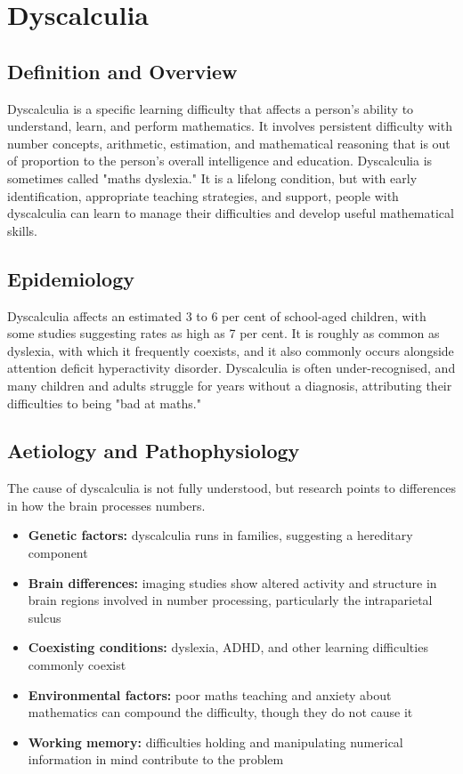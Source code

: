 \chapter{Dyscalculia}

\section*{Definition and Overview}
Dyscalculia is a specific learning difficulty that affects a person's ability to understand, learn, and perform mathematics. It involves persistent difficulty with number concepts, arithmetic, estimation, and mathematical reasoning that is out of proportion to the person's overall intelligence and education. Dyscalculia is sometimes called "maths dyslexia." It is a lifelong condition, but with early identification, appropriate teaching strategies, and support, people with dyscalculia can learn to manage their difficulties and develop useful mathematical skills.

\section*{Epidemiology}
Dyscalculia affects an estimated 3 to 6 per cent of school-aged children, with some studies suggesting rates as high as 7 per cent. It is roughly as common as dyslexia, with which it frequently coexists, and it also commonly occurs alongside attention deficit hyperactivity disorder. Dyscalculia is often under-recognised, and many children and adults struggle for years without a diagnosis, attributing their difficulties to being "bad at maths."

\section*{Aetiology and Pathophysiology}
The cause of dyscalculia is not fully understood, but research points to differences in how the brain processes numbers.
\begin{itemize}
    \item \textbf{Genetic factors:} dyscalculia runs in families, suggesting a hereditary component
    \item \textbf{Brain differences:} imaging studies show altered activity and structure in brain regions involved in number processing, particularly the intraparietal sulcus
    \item \textbf{Coexisting conditions:} dyslexia, ADHD, and other learning difficulties commonly coexist
    \item \textbf{Environmental factors:} poor maths teaching and anxiety about mathematics can compound the difficulty, though they do not cause it
    \item \textbf{Working memory:} difficulties holding and manipulating numerical information in mind contribute to the problem
\end{itemize}

